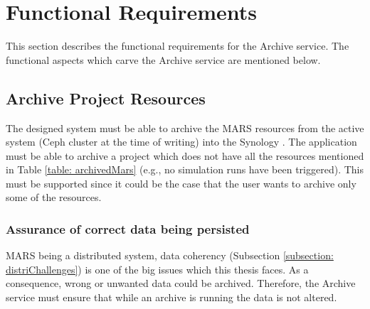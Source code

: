 
\section{Functional Requirements}
    \label{section:functionalReq}
    This section describes the functional requirements for the Archive service.
    The functional aspects which carve the Archive service are mentioned below.

    \subsection{Archive Project Resources}
        The designed system must be able to archive the MARS resources from the active system (Ceph cluster at the time of writing) 
        into the Synology \cite{Synology}. The application must
        be able to archive a project which does not have all the resources mentioned in Table \ref{table: archivedMars} (e.g., no simulation runs have been triggered).
        This must be supported since it could be the case that the user wants to archive only some of the resources.

        \subsubsection{Assurance of correct data being persisted}
            MARS being a distributed system, data coherency (Subsection \ref{subsection: distriChallenges}) 
            is one of the big issues which this thesis faces. As a consequence,
            wrong or unwanted data could be archived. Therefore, the Archive service must ensure that while an archive is running the data is not
            altered.
        
